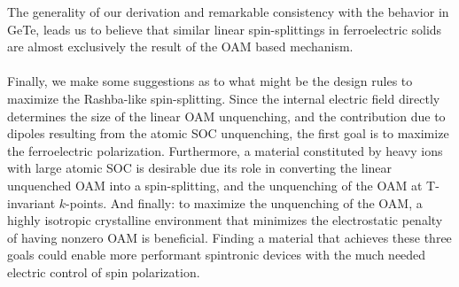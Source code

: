 The generality of our derivation and remarkable consistency with the behavior in GeTe, leads us to believe that similar linear spin-splittings in ferroelectric solids are almost exclusively the result of the OAM based mechanism.
\\\\
Finally, we make some suggestions as to what might be the design rules to maximize the Rashba-like spin-splitting.
Since the internal electric field directly determines the size of the linear OAM unquenching, and the contribution due to dipoles resulting from the atomic SOC unquenching, the first goal is to maximize the ferroelectric polarization.
Furthermore, a material constituted by heavy ions with large atomic SOC is desirable due its role in converting the linear unquenched OAM into a spin-splitting, and the unquenching of the OAM at T-invariant $k$-points.
And finally: to maximize the unquenching of the OAM, a highly isotropic crystalline environment that minimizes the electrostatic penalty of having nonzero OAM is beneficial.
Finding a material that achieves these three goals could enable more performant spintronic devices with the much needed electric control of spin polarization.

